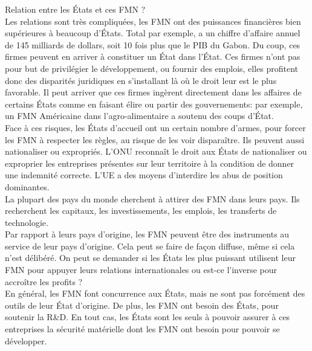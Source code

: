 \documentclass[10pt, a4paper, openany]{book}
\begin{document}
Relation entre les États et ces FMN ? \\
Les relations sont très compliquées, les FMN ont des puissances financières bien supérieures à beaucoup d'États. Total par exemple, a un chiffre d'affaire annuel de 145 milliards de dollars, soit 10 fois plus que le PIB du Gabon. Du coup, ces firmes peuvent en arriver à constituer un État dans l'État. Ces firmes n'ont pas pour but de privilégier le développement, ou fournir des emplois, elles profitent donc des disparités juridiques en s'installant là où le droit leur est le plus favorable. Il peut arriver que ces firmes ingèrent directement dans les affaires de certains États comme en faisant élire ou partir des gouvernements: par exemple, un FMN Américaine dans l'agro-alimentaire a soutenu des coups d'État. \\
Face à ces risques, les États d'accueil ont un certain nombre d'armes, pour forcer les FMN à respecter les règles, au risque de les voir disparaître. Ils peuvent aussi nationaliser ou expropriés. L'ONU reconnaît le droit aux États de nationaliser ou exproprier les entreprises présentes sur leur territoire à la condition de donner une indemnité correcte. L'UE a des moyens d'interdire les abus de position dominantes. \\
La plupart des pays du monde cherchent à attirer des FMN dans leurs pays. Ils recherchent les capitaux, les investissements, les emplois, les transferts de technologie. \\
Par rapport à leurs pays d'origine, les FMN peuvent être des instruments au service de leur pays d'origine. Cela peut se faire de façon diffuse, même si cela n'est délibéré. On peut se demander si les États les plus puissant utilisent leur FMN pour appuyer leurs relations internationales ou est-ce l'inverse pour accroître les profits ? \\
En général, les FMN font concurrence aux États, mais ne sont pas forcément des outils de leur État d'origine. De plus, les FMN ont besoin des États, pour soutenir la R\&D. En tout cas, les États sont les seuls à pouvoir assurer à ces entreprises la sécurité matérielle dont les FMN ont besoin pour pouvoir se développer. 
\end{document}

